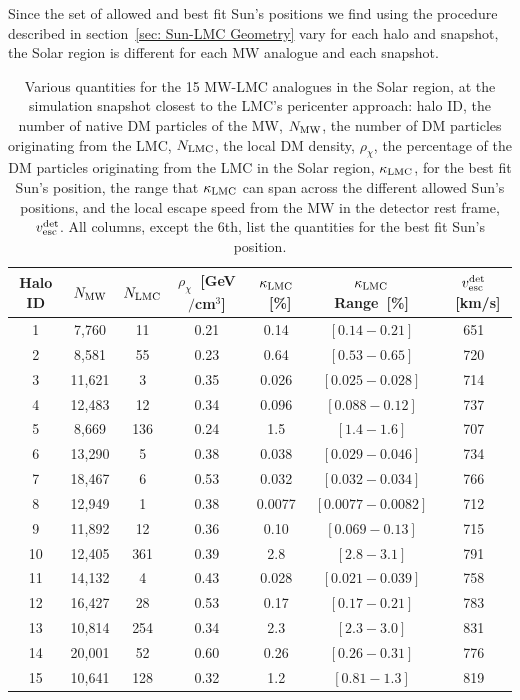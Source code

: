 Since the set of allowed and best fit Sun's positions we find using the procedure described in section~\ref{sec: Sun-LMC Geometry} vary for each halo and snapshot, the Solar region is  different for each MW analogue and each snapshot.

\begin{table}[t!]
    \centering
    \begin{tabular}{|c|c|c|c|c|c|c|}
      \hline
      Halo ID  & $N_{\rm MW}$ & $N_{\rm LMC}$ & $\rho_{\chi}$~[GeV$/$cm$^3$] & $\kappa_{\rm LMC}$~[\%] & $\kappa_{\rm LMC}$ Range~[\%] & $v_{\rm esc}^{\rm det}$~[km/s] \\
       \hline
       1  & 7,760 & 11 & 0.21 & 0.14 & $[0.14-0.21]$ & 651  \\
       2  & 8,581 & 55 & 0.23 & 0.64 & $[0.53-0.65]$ & 720 \\
       3 & 11,621 & 3 & 0.35 & 0.026 & $[0.025-0.028]$ & 714 \\
       4  & 12,483 & 12 & 0.34 & 0.096 & $[0.088-0.12]$ & 737 \\
       5  & 8,669 & 136 & 0.24 & 1.5 & $[1.4-1.6]$ & 707 \\
       6  & 13,290 & 5 &  0.38 & 0.038 & $[0.029-0.046]$ &  734 \\
       7  & 18,467 & 6 &  0.53 & 0.032 & $[0.032-0.034]$ & 766 \\
       8  & 12,949 & 1 & 0.38 & 0.0077 & $[0.0077-0.0082]$ & 712 \\
       9  & 11,892 & 12 & 0.36 & 0.10 & $[0.069-0.13]$ & 715 \\
       10 & 12,405 & 361 & 0.39 & 2.8 & $[2.8-3.1]$ & 791\\
       11  & 14,132 & 4 & 0.43 & 0.028 & $[0.021-0.039]$ & 758 \\
       12  & 16,427 & 28 & 0.53 & 0.17 & $[0.17-0.21]$ & 783 \\
       13 & 10,814 & 254 &  0.34 & 2.3 & $[2.3-3.0]$ & 831 \\
       14  & 20,001 & 52 & 0.60 & 0.26 & $[0.26-0.31]$ & 776 \\
       15 & 10,641 & 128 &  0.32 & 1.2 & $[0.81-1.3]$ & 819 \\
      \hline
    \end{tabular}%
\caption{Various quantities for the 15 MW-LMC analogues in the Solar region, at the simulation snapshot closest to the LMC's pericenter approach: halo ID, the number of native DM particles of the MW, $N_{\rm MW}$, the number of DM particles originating from the LMC, $N_{\rm LMC}$, the local DM density, $\rho_\chi$, the  percentage of the DM particles originating from the LMC in the Solar region, $\kappa_{\rm LMC}$, for the best fit Sun's position, the range that $\kappa_{\rm LMC}$ can span across the different allowed Sun's positions, and the local escape speed from the MW in the detector rest frame, $v_{\rm esc}^{\rm det}$. All columns, except the 6th, list the quantities for the best fit Sun's position.} 
    \label{tab:Localrho}
  \end{table}  

